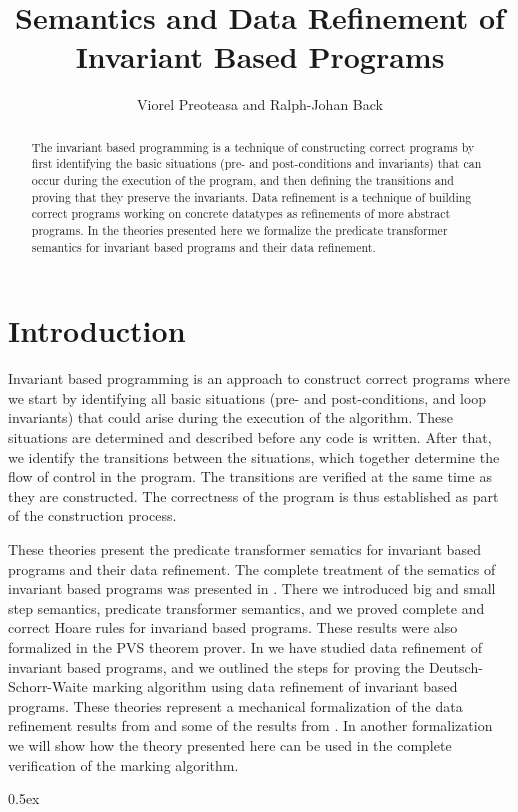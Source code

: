 \documentclass[11pt,a4paper]{article}
\begin{document}
\title{Semantics and Data Refinement of Invariant Based Programs}

\author{Viorel Preoteasa and Ralph-Johan Back}

\maketitle

\begin{abstract}
The invariant based programming is a technique of constructing
correct programs by first identifying the basic situations
(pre- and post-conditions and invariants) that can occur during
the execution of the program, and then defining the transitions
and proving that they preserve the invariants. Data refinement is a 
technique of building correct programs working on concrete datatypes
as refinements of more abstract programs. In the theories presented here 
we formalize the predicate transformer semantics for invariant based 
programs and their data refinement.
\end{abstract}

\tableofcontents

\section{Introduction}
Invariant based programming 
\cite{Back80:invariants,Back83:invariants,aBack08,back:preoteasa:2008} 
is an approach to construct correct programs where we start by 
identifying all basic situations (pre- and post-conditions, and loop 
invariants) that could arise during the execution of the algorithm. 
These situations are determined and described before any code is written. 
After that, we identify the transitions between the situations, which 
together determine the flow of control in the program. The transitions 
are verified at the same time as they are constructed. The correctness 
of the program is thus established as part of the construction process.

These theories present the predicate transformer sematics for invariant based 
programs and their data refinement. The complete treatment of the sematics of 
invariant based programs was presented in 
\cite{back:preoteasa:2008}. There we introduced big and small step semantics, 
predicate transformer semantics, and we proved complete and correct Hoare
rules for invariand based programs. These results were also formalized 
in the PVS theorem prover. In \cite{preoteasa:back:2009} we have studied
data refinement of invariant based programs, and we outlined the steps
for proving the Deutsch-Schorr-Waite marking algorithm using data refinement
of invariant based programs. These theories represent a mechanical 
formalization of the data refinement results from \cite{preoteasa:back:2009}
and some of the results from \cite{back:preoteasa:2008}. In another 
formalization we will show how the theory presented here can be used
in the complete verification of the marking algorithm.


\parindent 0pt\parskip 0.5ex





\end{document}

